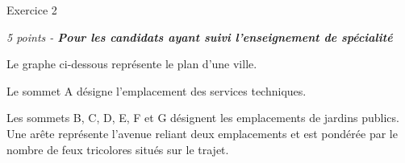 
%
\begin{h2}Exercice 2\end{h2}
\par
\textit{5 points - \textbf{Pour les candidats ayant  suivi l'enseignement de spécialité}}
\par
Le graphe ci-dessous représente le plan d'une ville.
\par
Le sommet A désigne l'emplacement des services techniques.
\par
Les sommets B, C, D, E, F et G désignent les emplacements de jardins publics. Une arête représente l'avenue reliant deux emplacements et est pondérée par le nombre de feux tricolores situés sur le trajet.

